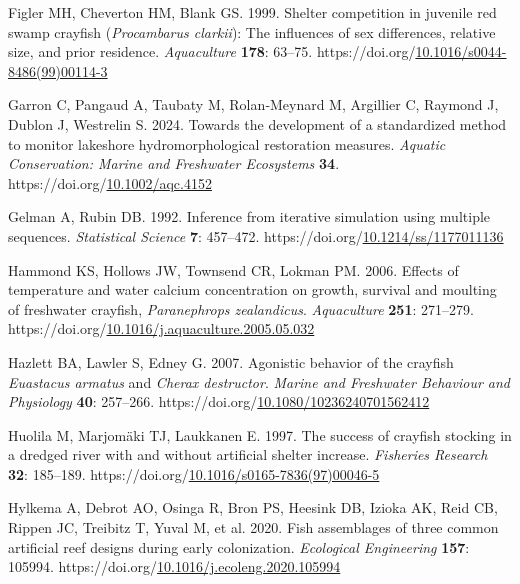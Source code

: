 \documentclass[
  letterpaper,
  DIV=11,
  numbers=noendperiod]{scrartcl}
\newlength{\cslhangindent}
\newenvironment{CSLReferences}[2] %
 {\begin{list}{}{%
  \setlength{\itemindent}{0pt}
  \setlength{\leftmargin}{0pt}
  \setlength{\parsep}{0pt}
  \ifodd #1
   \setlength{\leftmargin}{\cslhangindent}
   \setlength{\itemindent}{-1\cslhangindent}
  \fi
  \setlength{\itemsep}{#2\baselineskip}}}
 {\end{list}}
\begin{document}
\begin{CSLReferences}{1}{0}
Figler MH, Cheverton HM, Blank GS. 1999. Shelter competition in juvenile
red swamp crayfish ({\emph{Procambarus clarkii}}): The influences of sex
differences, relative size, and prior residence. \emph{Aquaculture}
\textbf{178}: 63--75.
https://doi.org/\href{https://doi.org/10.1016/s0044-8486(99)00114-3}{10.1016/s0044-8486(99)00114-3}

Garron C, Pangaud A, Taubaty M, Rolan‐Meynard M, Argillier C, Raymond J,
Dublon J, Westrelin S. 2024. Towards the development of a standardized
method to monitor lakeshore hydromorphological restoration measures.
\emph{Aquatic Conservation: Marine and Freshwater Ecosystems}
\textbf{34}.
https://doi.org/\href{https://doi.org/10.1002/aqc.4152}{10.1002/aqc.4152}

Gelman A, Rubin DB. 1992. Inference from iterative simulation using
multiple sequences. \emph{Statistical Science} \textbf{7}: 457--472.
https://doi.org/\href{https://doi.org/10.1214/ss/1177011136}{10.1214/ss/1177011136}

Hammond KS, Hollows JW, Townsend CR, Lokman PM. 2006. Effects of
temperature and water calcium concentration on growth, survival and
moulting of freshwater crayfish, {\emph{Paranephrops zealandicus}}.
\emph{Aquaculture} \textbf{251}: 271--279.
https://doi.org/\href{https://doi.org/10.1016/j.aquaculture.2005.05.032}{10.1016/j.aquaculture.2005.05.032}

Hazlett BA, Lawler S, Edney G. 2007. Agonistic behavior of the crayfish
{\emph{Euastacus armatus}} and {\emph{Cherax destructor}}. \emph{Marine
and Freshwater Behaviour and Physiology} \textbf{40}: 257--266.
https://doi.org/\href{https://doi.org/10.1080/10236240701562412}{10.1080/10236240701562412}

Huolila M, Marjomäki TJ, Laukkanen E. 1997. The success of crayfish
stocking in a dredged river with and without artificial shelter
increase. \emph{Fisheries Research} \textbf{32}: 185--189.
https://doi.org/\href{https://doi.org/10.1016/s0165-7836(97)00046-5}{10.1016/s0165-7836(97)00046-5}

Hylkema A, Debrot AO, Osinga R, Bron PS, Heesink DB, Izioka AK, Reid CB,
Rippen JC, Treibitz T, Yuval M, et al. 2020. Fish assemblages of three
common artificial reef designs during early colonization.
\emph{Ecological Engineering} \textbf{157}: 105994.
https://doi.org/\href{https://doi.org/10.1016/j.ecoleng.2020.105994}{10.1016/j.ecoleng.2020.105994}


\end{CSLReferences}
\end{document}
